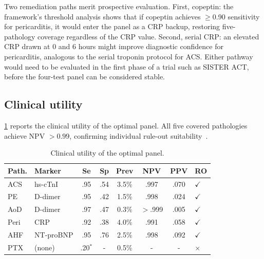 \documentclass[11pt, oneside]{article}
\begin{document}
Two remediation paths merit prospective evaluation. First, copeptin: the framework's threshold analysis shows that if copeptin achieves $\geq$0.90 sensitivity for pericarditis, it would enter the panel as a CRP backup, restoring five-pathology coverage regardless of the CRP value. Second, serial CRP: an elevated CRP drawn at 0 and 6 hours might improve diagnostic confidence for pericarditis, analogous to the serial troponin protocol for ACS. Either pathway would need to be evaluated in the first phase of a trial such as SISTER ACT, before the four-test panel can be considered stable.

\subsection{Clinical utility}

\cref{tab:utility} reports the clinical utility of the optimal panel. All five covered pathologies achieve NPV $> 0.99$, confirming individual rule-out suitability~\cite{Lord2006}.

\begin{table}[h]
\centering
\caption{Clinical utility of the optimal panel.}
\label{tab:utility}
\scriptsize
\setlength{\tabcolsep}{3pt}
\begin{tabular}{@{}llcccccl@{}}
\toprule
\textbf{Path.} & \textbf{Marker} & \textbf{Se} & \textbf{Sp} & \textbf{Prev} & \textbf{NPV} & \textbf{PPV} & \textbf{RO} \\
\midrule
ACS  & hs-cTnI   & .95 & .54 & 3.5\% & .997  & .070 & $\checkmark$ \\
PE   & D-dimer   & .95 & .42 & 1.5\% & .998  & .024 & $\checkmark$ \\
AoD  & D-dimer   & .97 & .47 & 0.3\% & $>$.999 & .005 & $\checkmark$ \\
Peri & CRP       & .92 & .38 & 4.0\% & .991  & .058 & $\checkmark$ \\
AHF  & NT-proBNP & .95 & .76 & 2.5\% & .998  & .092 & $\checkmark$ \\
PTX  & (none)    & .20$^*$ & - & 0.5\% & -   & -  & $\times$ \\
\bottomrule
\end{tabular}
\par{}
\end{table}
\end{document}
